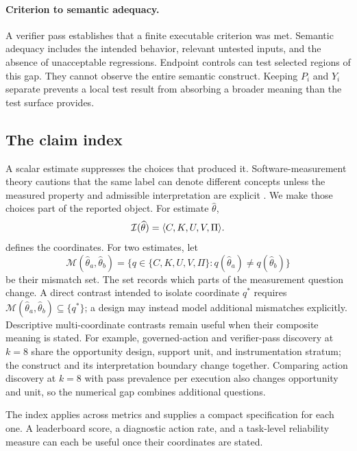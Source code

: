 \paragraph{Criterion to semantic adequacy.}
A verifier pass establishes that a finite executable criterion was met. Semantic adequacy includes the intended behavior, relevant untested inputs, and the absence of unacceptable regressions. Endpoint controls can test selected regions of this gap. They cannot observe the entire semantic construct. Keeping $P_i$ and $Y_i$ separate prevents a local test result from absorbing a broader meaning than the test surface provides.

\subsection{The claim index}

A scalar estimate suppresses the choices that produced it. Software-measurement theory cautions that the same label can denote different concepts unless the measured property and admissible interpretation are explicit \citep{briand1996measurement}. We make those choices part of the reported object. For estimate $\widehat\theta$,
\begin{equation}
\mathcal{I}(\widehat\theta)
=
\langle C,K,U,V,\Pi\rangle.
\label{eq:claim-index}
\end{equation}
 defines the coordinates. For two estimates, let
\begin{equation}
\mathcal M(\widehat\theta_a,\widehat\theta_b)
=
\{q\in\{C,K,U,V,\Pi\}:q(\widehat\theta_a)\neq q(\widehat\theta_b)\}
\label{eq:mismatch-set}
\end{equation}
be their mismatch set. The set records which parts of the measurement question change. A direct contrast intended to isolate coordinate $q^*$ requires $\mathcal M(\widehat\theta_a,\widehat\theta_b)\subseteq\{q^*\}$; a design may instead model additional mismatches explicitly. Descriptive multi-coordinate contrasts remain useful when their composite meaning is stated. For example, governed-action and verifier-pass discovery at $k=8$ share the opportunity design, support unit, and instrumentation stratum; the construct and its interpretation boundary change together. Comparing action discovery at $k=8$ with pass prevalence per execution also changes opportunity and unit, so the numerical gap combines additional questions.



The index applies across metrics and supplies a compact specification for each one. A leaderboard score, a diagnostic action rate, and a task-level reliability measure can each be useful once their coordinates are stated.


